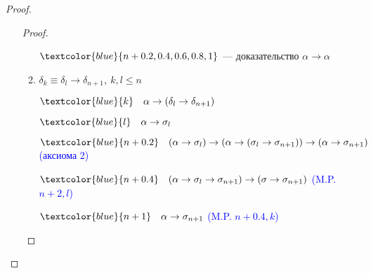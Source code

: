 \begin{proof}
\begin{itemize}
\begin{proof}
\begin{enumerate}
                            \(\textcolor{blue}{n + 0.2, 0.4, 0.6, 0.8, 1}\) --- доказательство \(\alpha \to \alpha\)

                      \item \(\delta_k \equiv \delta_l \to \delta_{n + 1},\ k, l \leq n\)

                            \(\textcolor{blue}{k} \quad \alpha \to (\delta_l \to \delta_{n + 1})\)

                            \(\textcolor{blue}{l} \quad  \alpha \to \sigma_l\)

                            \(\textcolor{blue}{n + 0.2} \quad (\alpha \to \sigma_l) \to (\alpha \to (\sigma_l \to \sigma_{n + 1})) \to (\alpha \to \sigma_{n + 1})\) \textcolor{blue}{(аксиома 2)}

                            \(\textcolor{blue}{n + 0.4} \quad (\alpha \to \sigma_l \to \sigma_{n + 1}) \to (\sigma \to \sigma_{n + 1})\) \textcolor{blue}{(M.P. \(n + 2, l\))}

                            \(\textcolor{blue}{n + 1} \quad \alpha \to \sigma_{n + 1}\) \textcolor{blue}{(M.P. \(n + 0.4, k\))}
                  \end{enumerate}
              \end{proof}
    \end{itemize}
\end{proof}

